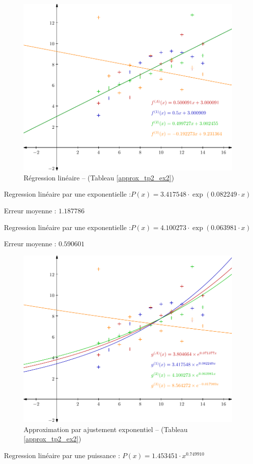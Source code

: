 \documentclass{report}
\begin{document}
	\begin{figure}[h]
	  \centering
	  \includegraphics{graphiques/pdf_output/reglin_tp2_ex2_1.pdf}
	  \caption{Régression linéaire -- (Tableau \ref{approx_tp2_ex2})}
	\end{figure}
	\newpage
        Regression linéaire par une exponentielle :$P(x) = 3.417548 \cdot \exp(0.082249 \cdot x)$
        
        Erreur moyenne : $1.187786$

        Regression linéaire par une exponentielle :$P(x) = 4.100273 \cdot \exp(0.063981 \cdot x)$
        
        Erreur moyenne : $0.590601$

	\begin{figure}[h]
	  \centering
	  \includegraphics{graphiques/pdf_output/reglin_tp2_ex2_2.pdf}
	  \caption{Approximation par ajustement exponentiel -- (Tableau \ref{approx_tp2_ex2})}
	\end{figure}
	\newpage
        Regression linéaire par une puissance : $P(x) = 1.453451 \cdot x^{0.749910}$
        
\end{document}
